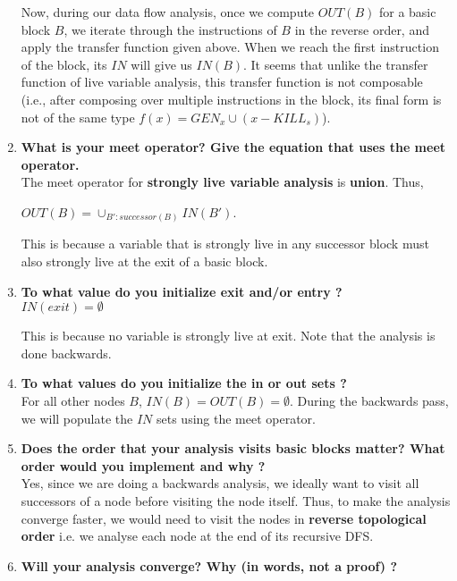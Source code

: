 \begin{enumerate}
Now, during our data flow analysis, once we compute $OUT(B)$ for a basic block $B$, we iterate through the instructions of $B$ in the reverse order, and apply the transfer function given above. When we reach the first instruction of the block, its $IN$ will give us $IN(B)$. It seems that unlike the transfer function of live variable analysis, this transfer function is not composable (i.e., after composing over multiple instructions in the block, its final form is not of the same type $f(x) = GEN_x \cup (x-KILL_s)$).  

\item \textbf{What is your meet operator? Give the equation that uses the meet operator.} \\

  The meet operator for \textbf{strongly live variable analysis} is \textbf{union}. Thus,

  $OUT(B) = \cup_{B' : successor(B)} IN(B')$.

  This is because a variable that is strongly live in any successor block must also strongly live at the exit of a basic block. 

\item \textbf{To what value do you initialize exit and/or entry ?} \\

  $IN(exit) = \emptyset$

  This is because no variable is strongly live at exit. Note that the analysis is done backwards.

\item \textbf{To what values do you initialize the in or out sets ?} \\

  For all other nodes $B$, $IN(B) = OUT(B) = \emptyset$. During the backwards pass, we will populate the $IN$ sets
  using the meet operator.

\item \textbf{Does the order that your analysis visits basic blocks matter? What order would you implement and why ?} \\

  Yes, since we are doing a backwards analysis, we ideally want to visit all successors of a node before visiting the node itself.
  Thus, to make the analysis converge faster, we would need to visit the nodes in \textbf{reverse topological order} i.e. we analyse each node
  at the end of its recursive DFS.

\item \textbf{Will your analysis converge? Why (in words, not a proof) ?} \\


\end{enumerate}

